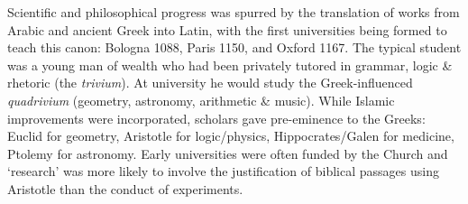 
Scientific and philosophical progress was spurred by the translation of works from Arabic and ancient Greek into Latin, with the first universities being formed to teach this canon: Bologna 1088, Paris 1150, and Oxford 1167. The typical student was a young man of wealth who had been privately tutored in grammar, logic \& rhetoric (the \emph{trivium}). At university he would study the Greek-influenced \emph{quadrivium} (geometry, astronomy, arithmetic \& music). While Islamic improvements were incorporated, scholars gave pre-eminence to the Greeks: Euclid for geometry, Aristotle for logic/physics, Hippocrates/Galen for medicine, Ptolemy for astronomy. Early universities were often funded by the Church and `research' was more likely to involve the justification of biblical passages using Aristotle than the conduct of experiments.



